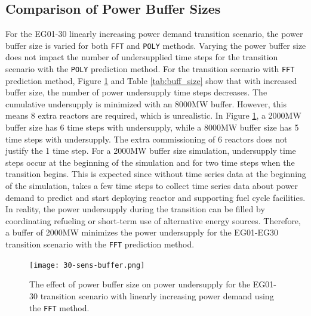 \subsection{Comparison of Power Buffer Sizes}
For the EG01-30 linearly increasing power demand 
transition scenario, the power buffer size is varied
for both \texttt{FFT} and \texttt{POLY} methods. 
Varying the power buffer size does not impact the number of 
undersupplied time steps for the transition scenario 
with the \texttt{POLY} prediction method.
For the transition scenario with \texttt{FFT} prediction method, 
Figure \ref{fig:eg30-bufplot} and Table \ref{tab:buff_size} 
show that with increased buffer size, the number of 
power undersupply time steps decreases. 
The cumulative undersupply is minimized with an 8000MW 
buffer.
However, this means 8 extra reactors are required, which 
is unrealistic.
In Figure \ref{fig:eg30-bufplot}, a 2000MW buffer size has 
6 time steps with undersupply, while a 8000MW buffer size has 
5 time steps with undersupply. 
The extra commissioning of 6 reactors does not justify the 1 time 
step. 
For a 2000MW buffer size simulation, undersupply time 
steps occur at the beginning of the simulation and for two 
time steps when the transition begins. 
This is expected since without time series data 
at the beginning of the simulation, \deploy takes a few 
time steps to collect time series data about power demand 
to predict and start deploying reactor and supporting 
fuel cycle facilities. 
In reality, the power undersupply during the transition 
can be filled by coordinating refueling or short-term use of 
alternative energy sources.  
Therefore, a buffer of 2000MW minimizes 
the power undersupply for the EG01-EG30 transition scenario
with the \texttt{FFT} prediction method.

\begin{figure}[]
		\centering
		\texttt{[image: 30-sens-buffer.png]} 
    \caption{The effect of power buffer size on 
    power undersupply for the EG01-30 transition scenario with linearly 
    increasing power demand using the \texttt{FFT} method.}
    \label{fig:eg30-bufplot}
\end{figure}

